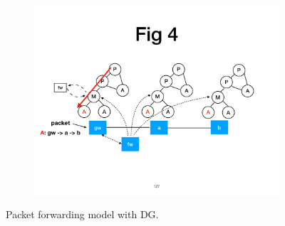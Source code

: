 \begin{figure}[!htbp]
\centering
\begin{subfigure}{0.8\linewidth}
      \centering\includegraphics[width=\linewidth]{figures/ss-127.pdf}
\end{subfigure}
\vspace{-2mm}
\caption{\small Packet forwarding model with DG.}
\label{fig:pfm-example}
\end{figure}



